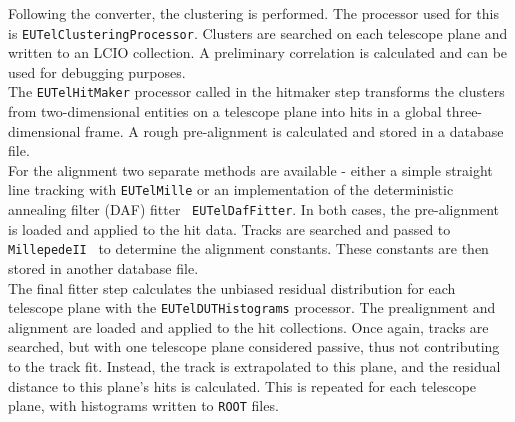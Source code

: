 Following the converter, the clustering is performed. The processor used for
this is \texttt{EUTelClusteringProcessor}. Clusters are searched on each
telescope plane and written to an LCIO collection. A preliminary correlation is
calculated and can be used for debugging purposes.\\

The \texttt{EUTelHitMaker} processor called in the hitmaker step transforms the
clusters from two-dimensional entities on a telescope plane into hits in a
global three-dimensional frame. A rough pre-alignment is calculated and stored
in a database file.\\

For the alignment two separate methods are available - either a simple straight
line tracking with \texttt{EUTelMille} or an implementation of the deterministic
annealing filter (DAF) fitter~\cite{ref:daffitter} \texttt{EUTelDafFitter}. In
both cases, the pre-alignment is loaded and applied to the hit data. Tracks are
searched and passed to \texttt{MillepedeII}~\cite{ref:millepede} to determine
the alignment constants. These constants are then stored in another database
file.\\

The final fitter step calculates the unbiased residual distribution for each
telescope plane with the \texttt{EUTelDUTHistograms} processor. The prealignment
and alignment are loaded and applied to the hit collections. Once again, tracks
are searched, but with one telescope plane considered passive, thus not
contributing to the track fit. Instead, the track is extrapolated to this plane,
and the residual distance to this plane's hits is calculated. This is repeated
for each telescope plane, with histograms written to \texttt{ROOT} files.\\


